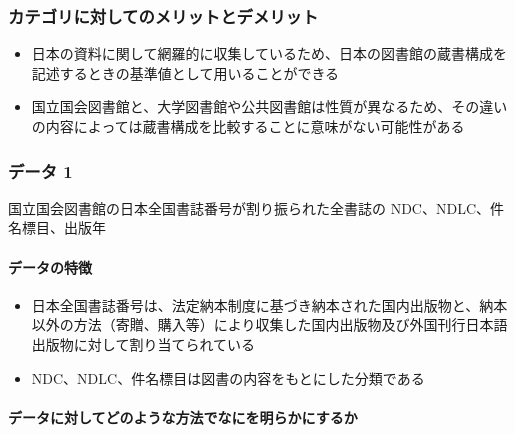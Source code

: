 \hypertarget{ux30abux30c6ux30b4ux30eaux306bux5bfeux3057ux3066ux306eux30e1ux30eaux30c3ux30c8ux3068ux30c7ux30e1ux30eaux30c3ux30c8-3}{%
\subsubsection{カテゴリに対してのメリットとデメリット}\label{ux30abux30c6ux30b4ux30eaux306bux5bfeux3057ux3066ux306eux30e1ux30eaux30c3ux30c8ux3068ux30c7ux30e1ux30eaux30c3ux30c8-3}}

\begin{itemize}
\tightlist
\item
  日本の資料に関して網羅的に収集しているため、日本の図書館の蔵書構成を記述するときの基準値として用いることができる
\item
  国立国会図書館と、大学図書館や公共図書館は性質が異なるため、その違いの内容によっては蔵書構成を比較することに意味がない可能性がある
\end{itemize}

\hypertarget{ux30c7ux30fcux30bf-1-3}{%
\subsubsection{データ 1}\label{ux30c7ux30fcux30bf-1-3}}

国立国会図書館の日本全国書誌番号が割り振られた全書誌の
NDC、NDLC、件名標目、出版年

\hypertarget{ux30c7ux30fcux30bfux306eux7279ux5fb4-5}{%
\paragraph{データの特徴}\label{ux30c7ux30fcux30bfux306eux7279ux5fb4-5}}

\begin{itemize}
\tightlist
\item
  日本全国書誌番号は、法定納本制度に基づき納本された国内出版物と、納本以外の方法（寄贈、購入等）により収集した国内出版物及び外国刊行日本語出版物に対して割り当てられている
\item
  NDC、NDLC、件名標目は図書の内容をもとにした分類である\cite{ChongShi2011}
\end{itemize}

\hypertarget{ux30c7ux30fcux30bfux306bux5bfeux3057ux3066ux3069ux306eux3088ux3046ux306aux65b9ux6cd5ux3067ux306aux306bux3092ux660eux3089ux304bux306bux3059ux308bux304b-5}{%
\paragraph{データに対してどのような方法でなにを明らかにするか}\label{ux30c7ux30fcux30bfux306bux5bfeux3057ux3066ux3069ux306eux3088ux3046ux306aux65b9ux6cd5ux3067ux306aux306bux3092ux660eux3089ux304bux306bux3059ux308bux304b-5}}

